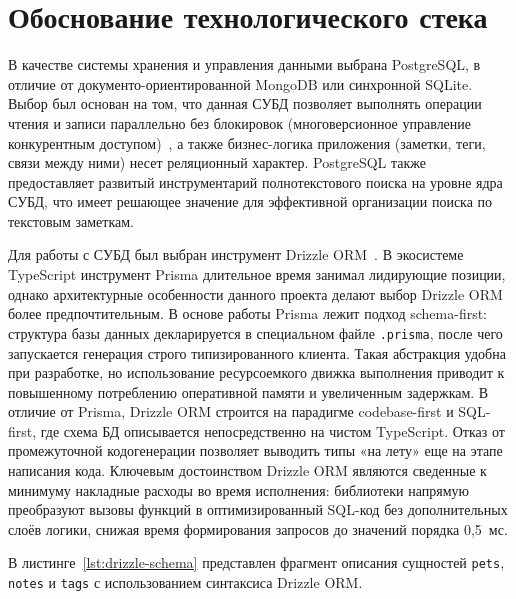 \documentclass[a4paper,14pt]{extreport}
\begin{document}
\newpage

\section{Обоснование технологического стека}

В качестве системы хранения и управления данными выбрана PostgreSQL, в отличие от документо-ориентированной MongoDB или синхронной SQLite. Выбор был основан на том, что данная СУБД позволяет выполнять операции чтения и записи параллельно без блокировок (многоверсионное управление конкурентным доступом)~\cite{ref12}, а также бизнес-логика приложения (заметки, теги, связи между ними) несет реляционный характер. PostgreSQL также предоставляет развитый инструментарий полнотекстового поиска на уровне ядра СУБД, что имеет решающее значение для эффективной организации поиска по текстовым заметкам.

Для работы с СУБД был выбран инструмент Drizzle ORM~\cite{ref16}. В экосистеме TypeScript инструмент Prisma длительное время занимал лидирующие позиции, однако архитектурные особенности данного проекта делают выбор Drizzle ORM более предпочтительным. В основе работы Prisma лежит подход schema-first: структура базы данных декларируется в специальном файле \texttt{.prisma}, после чего запускается генерация строго типизированного клиента. Такая абстракция удобна при разработке, но использование ресурсоемкого движка выполнения приводит к повышенному потреблению оперативной памяти и увеличенным задержкам. В отличие от Prisma, Drizzle ORM строится на парадигме codebase-first и SQL-first, где схема БД описывается непосредственно на чистом TypeScript. Отказ от промежуточной кодогенерации позволяет выводить типы «на лету» еще на этапе написания кода. Ключевым достоинством Drizzle ORM являются сведенные к минимуму накладные расходы во время исполнения: библиотеки напрямую преобразуют вызовы функций в оптимизированный SQL-код без дополнительных слоёв логики, снижая время формирования запросов до значений порядка 0,5~мс.

В листинге~\ref{lst:drizzle-schema} представлен фрагмент описания сущностей \texttt{pets}, \texttt{notes} и \texttt{tags} с использованием синтаксиса Drizzle ORM.
\end{document}
